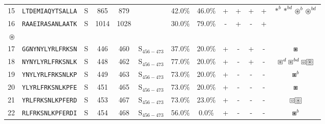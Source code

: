 \begin{tabular}{rcccccccccccc}
15 &  \texttt{LTDEMIAQYTSALLA} &       S &    865 &   879 &                &                          42.0\% &                           46.0\% &          + &           + &          + &           + &                                                   $ \ast^b \ast^{bd} \circledast^b \circledast^{bd} $ \\
16 &  \texttt{RAAEIRASANLAATK} &       S &   1014 &  1028 &                &                          30.0\% &                           79.0\% &          - &           + &          - &           + &                                 \Centerstack{  $\circ \circ^b \circ^d \circ^{bd}$ \\  $\circledast$ } \\
17 &  \texttt{GGNYNYLYRLFRKSN} &       S &    446 &   460 &  S$_{456-473}$ &                          37.0\% &                           20.0\% &          + &           - &          + &           - &                                                                                           $ \boxast $ \\
18 &  \texttt{NYNYLYRLFRKSNLK} &       S &    448 &   462 &  S$_{456-473}$ &                          77.0\% &                           20.0\% &          + &           - &          + &           - &                 $ \boxast^d \boxast^{bd} \boxcircle \setlength{\fboxsep}{0.5pt} \boxed{\circledast} $ \\
19 &  \texttt{YNYLYRLFRKSNLKP} &       S &    449 &   463 &  S$_{456-473}$ &                          73.0\% &                           20.0\% &          + &           - &          - &           - &                                                                                         $ \boxast^b $ \\
20 &  \texttt{YLYRLFRKSNLKPFE} &       S &    451 &   465 &  S$_{456-473}$ &                          73.0\% &                           20.0\% &          + &           - &          - &           - &                                                                                           $ \boxast $ \\
21 &  \texttt{YRLFRKSNLKPFERD} &       S &    453 &   467 &  S$_{456-473}$ &                          73.0\% &                           23.0\% &          + &           - &          - &           - &                                        $ \boxcircle \setlength{\fboxsep}{0.5pt} \boxed{\circledast} $ \\
22 &  \texttt{RLFRKSNLKPFERDI} &       S &    454 &   468 &  S$_{456-473}$ &                          56.0\% &                            0.0\% &          + &           - &          - &           - &                                                                                         $ \boxast^b $ \\

\end{tabular}
